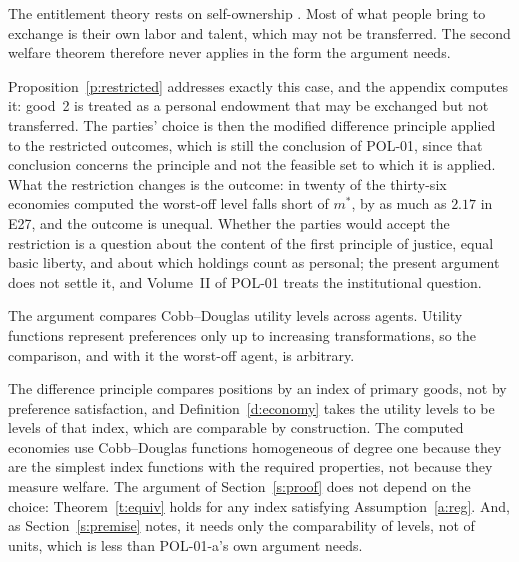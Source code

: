 \documentclass{situationist-preprint}
\begin{document}
\begin{objection}
The entitlement theory rests on self-ownership \citep{Cohen1995}. Most of what people bring to exchange is their own labor and talent, which may not be transferred. The second welfare theorem therefore never applies in the form the argument needs.
\end{objection}

\begin{reply}
Proposition~\ref{p:restricted} addresses exactly this case, and the appendix computes it: good~2 is treated as a personal endowment that may be exchanged but not transferred. The parties' choice is then the modified difference principle applied to the restricted outcomes, which is still the conclusion of POL-01, since that conclusion concerns the principle and not the feasible set to which it is applied. What the restriction changes is the outcome: in twenty of the thirty-six economies computed the worst-off level falls short of $m^*$, by as much as $2.17$ in E27, and the outcome is unequal. Whether the parties would accept the restriction is a question about the content of the first principle of justice, equal basic liberty, and about which holdings count as personal; the present argument does not settle it, and Volume~II of POL-01 treats the institutional question.
\end{reply}

\begin{objection}[Comparability]
The argument compares Cobb--Douglas utility levels across agents. Utility functions represent preferences only up to increasing transformations, so the comparison, and with it the worst-off agent, is arbitrary.
\end{objection}

\begin{reply}
The difference principle compares positions by an index of primary goods, not by preference satisfaction, and Definition~\ref{d:economy} takes the utility levels to be levels of that index, which are comparable by construction. The computed economies use Cobb--Douglas functions homogeneous of degree one because they are the simplest index functions with the required properties, not because they measure welfare. The argument of Section~\ref{s:proof} does not depend on the choice: Theorem~\ref{t:equiv} holds for any index satisfying Assumption~\ref{a:reg}. And, as Section~\ref{s:premise} notes, it needs only the comparability of levels, not of units, which is less than POL-01-a's own argument needs.
\end{reply}
\end{document}

